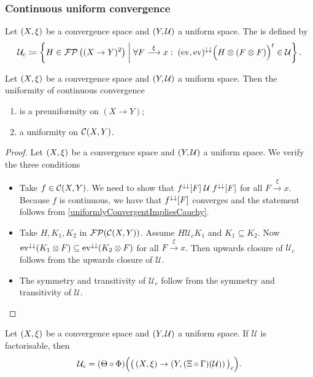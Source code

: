 \subsubsection{Continuous uniform convergence}
\begin{definition}
Let $\left( X, \xi \right)$ be a convergence space and $\left( Y, \mathcal{U} \right)$ a uniform space. The  is defined by
\[ \mathcal{U}_c \coloneqq \left\{ H\in \operatorname{\mathcal{FP}}\big((X\to Y)^2\big) \;\middle|\; \forall F\overset{\xi}{\longrightarrow} x:\; (\operatorname{ev}, \operatorname{ev})^{\downarrow\downarrow}\Big(H\otimes (F\otimes F)\Big)^t \in \mathcal{U} \right\}. \]
\end{definition}

\begin{lemma}
Let $\left( X, \xi \right)$ be a convergence space and $\left( Y, \mathcal{U} \right)$ a uniform space. Then the uniformity of continuous convergence
\begin{enumerate}
\item is a preuniformity on $(X\to Y)$;
\item a uniformity on $\operatorname{\mathcal{C}}(X,Y)$.
\end{enumerate}
\end{lemma}
\begin{proof}
Let $\left( X,\xi \right)$ be a convergence space and $\left( Y,\mathcal{U} \right)$ a uniform space. We verify the three conditions
\begin{itemize}
\item Take $f\in \operatorname{\mathcal{C}}(X,Y)$. We need to show that $f^{\downarrow\downarrow}[F]\mathrel{\mathcal{U}}f^{\downarrow\downarrow}[F]$ for all $F\overset{\xi}{\longrightarrow}x$. Because $f$ is continuous, we have that $f^{\downarrow\downarrow}[F]$ converges and the statement follows from \ref{uniformlyConvergentImpliesCauchy}.
\item Take $H,K_1,K_2$ in $\operatorname{\mathcal{FP}}(\operatorname{\mathcal{C}}(X,Y))$. Assume $H\mathrel{\mathcal{U}_c}K_1$ and $K_1\subseteq K_2$. Now $\operatorname{ev}^{\downarrow\downarrow}(K_1\otimes F) \subseteq \operatorname{ev}^{\downarrow\downarrow}(K_2\otimes F)$ for all $F\overset{\xi}{\longrightarrow}x$. Then upwards closure of $\mathcal{U}_c$ follows from the upwards closure of $\mathcal{U}$.
\item The symmetry and transitivity of $\mathcal{U}_c$ follow from the symmetry and transitivity of $\mathcal{U}$.
\end{itemize}
\end{proof}

\begin{lemma}
Let $\left( X, \xi \right)$ be a convergence space and $\left( Y, \mathcal{U} \right)$ a uniform space. If $\mathcal{U}$ is factorisable, then
\[ \mathcal{U}_c = (\Theta\circ\Phi)\Big(\big(\left( X,\xi \right) \to \left( Y, (\Xi\circ\Gamma)(\mathcal{U}) \right)\big)_c\Big). \]
\end{lemma}

